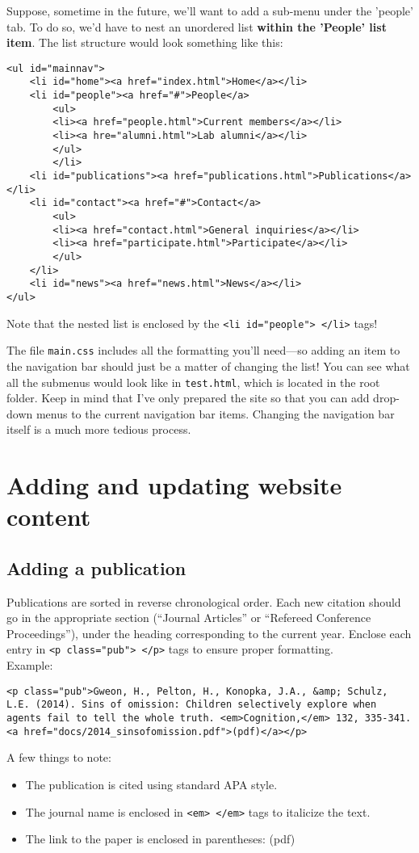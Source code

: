 \documentclass{article}
\begin{document}
Suppose, sometime in the future, we'll want to add a sub-menu under the 'people' tab. To do so, we'd have to nest an unordered list \textbf{within the 'People' list item}. The list structure would look something like this:
\begin{lstlisting}
<ul id="mainnav">
 	<li id="home"><a href="index.html">Home</a></li>
	<li id="people"><a href="#">People</a>
		<ul>
		<li><a href="people.html">Current members</a></li>
		<li><a hre="alumni.html">Lab alumni</a></li>
		</ul>
		</li>
	<li id="publications"><a href="publications.html">Publications</a></li>
	<li id="contact"><a href="#">Contact</a>
		<ul>
		<li><a href="contact.html">General inquiries</a></li>
		<li><a href="participate.html">Participate</a></li>
		</ul>
	</li>
	<li id="news"><a href="news.html">News</a></li>
</ul>
\end{lstlisting}

Note that the nested list is enclosed by the \lstinline|<li id="people"> </li>| tags!

The file \texttt{main.css} includes all the formatting you'll need---so adding an item to the navigation bar should just be a matter of changing the list! You can see what all the submenus would look like in \texttt{test.html}, which is located in the root folder. Keep in mind that I've only prepared the site so that you can add drop-down menus to the current navigation bar items. Changing the navigation bar itself is a much more tedious process.


\section{Adding and updating website content}

\subsection{Adding a publication}
Publications are sorted in reverse chronological order. Each new citation should go in the appropriate section (``Journal Articles'' or ``Refereed Conference Proceedings''), under the heading corresponding to the current year. Enclose each entry in \lstinline|<p class="pub"> </p>| tags to ensure proper formatting.\\

Example:
\begin{lstlisting}
<p class="pub">Gweon, H., Pelton, H., Konopka, J.A., &amp; Schulz, L.E. (2014). Sins of omission: Children selectively explore when agents fail to tell the whole truth. <em>Cognition,</em> 132, 335-341. <a href="docs/2014_sinsofomission.pdf">(pdf)</a></p>
\end{lstlisting}
A few things to note:
\begin{itemize}
	\item The publication is cited using standard APA style.
	\item The journal name is enclosed in \lstinline|<em> </em>| tags to italicize the text.
	\item The link to the paper is enclosed in parentheses: (pdf)
\end{itemize}
\end{document}

